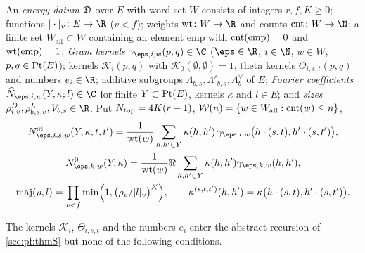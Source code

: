 \begin{definition}\label{pf:thmS-carrier:energydatum}
An \emph{energy datum} $\mathfrak{D}$ over $E$ with word set $W$ consists of integers $r,f,K\ge0$; functions
$|\cdot|_v\colon E\to\R$ ($v<f$); weights $\thmScarrierWt\colon W\to\R$ and counts $\thmScarrierCnt\colon W\to\N$; a
finite set $W_{\mathrm{all}}\subset W$ containing an element $\mathrm{emp}$ with $\operatorname{cnt}(\mathrm{emp})=0$ and
$\operatorname{wt}(\mathrm{emp})=1$; \emph{Gram kernels} $\gamma_{\eps,i,w}(p,q)\in\C$ ($\eps\in\R$, $i\in\N$, $w\in W$,
$p,q\in\mathrm{Pt}(E)$); kernels $\mathcal K_i(p,q)$ with $\mathcal K_0(\emptyset,\emptyset)=1$, theta kernels
$\Theta_{i,s,t}(p,q)$ and numbers $e_i\in\R$; additive subgroups $\Lambda_{b,s},\Lambda'_{b,s},\Lambda^\vee_b$ of $E$;
\emph{Fourier coefficients} $\thmScarrierNhat_{\eps,i,w}(Y,\kappa;l)\in\C$ for finite $Y\subset\mathrm{Pt}(E)$,
kernels $\kappa$ and $l\in E$; and \emph{sizes} $\rho^D_{i,v},\rho^L_{b,s,v},V_{b,s}\in\R$. Put
$N_{\mathrm{top}}=4K(r+1)$, $\mathcal{W}(n)=\{w\in W_{\mathrm{all}}:\operatorname{cnt}(w)\le n\}$,
\begin{gather*}
\thmScarrierNst_{\eps,i,s,w}(Y,\kappa;t,t')=\frac1{\thmScarrierWt(w)}\sum_{h,h'\in Y}\kappa(h,h')\,
  \gamma_{\eps,i,w}\bigl(h\cdot(s,t),h'\cdot(s,t')\bigr),\\
\thmScarrierNz_{\eps,k,w}(Y,\kappa)=\frac1{\thmScarrierWt(w)}\Re\sum_{h,h'\in Y}\kappa(h,h')\gamma_{\eps,k,w}(h,h'),\\
\thmScarrierMaj(\rho,l)=\prod_{v<f}\min\Bigl(1,\bigl(\rho_v/|l|_v\bigr)^K\Bigr),\qquad
\kappa^{(s,t,t')}(h,h')=\kappa\bigl(h\cdot(s,t),h'\cdot(s,t')\bigr).
\end{gather*}
\end{definition}

The kernels $\mathcal K_i$, $\Theta_{i,s,t}$ and the numbers $e_i$ enter the abstract recursion of \cref{sec:pf:thmS}
but none of the following conditions.

